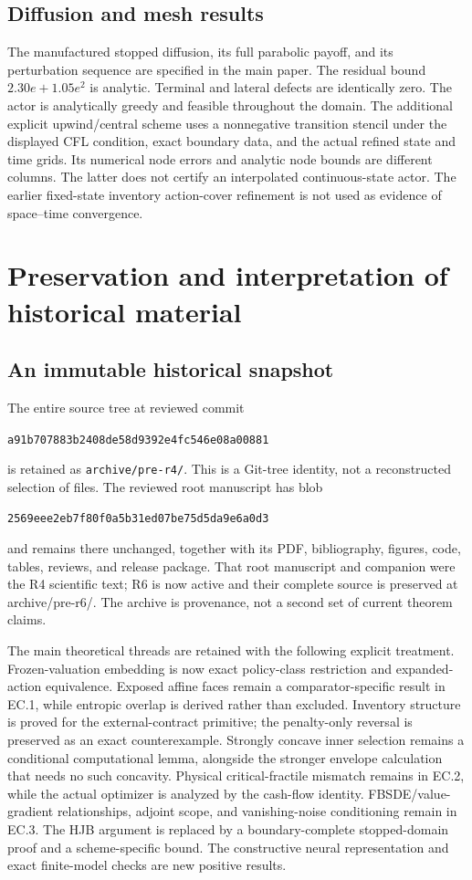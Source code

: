 \subsection{Diffusion and mesh results}
The manufactured stopped diffusion, its full parabolic payoff, and its perturbation sequence are specified in the main paper. The residual bound $2.30e+1.05e^2$ is analytic. Terminal and lateral defects are identically zero. The actor is analytically greedy and feasible throughout the domain. The additional explicit upwind/central scheme uses a nonnegative transition stencil under the displayed CFL condition, exact boundary data, and the actual refined state and time grids. Its numerical node errors and analytic node bounds are different columns. The latter does not certify an interpolated continuous-state actor. The earlier fixed-state inventory action-cover refinement is not used as evidence of space--time convergence.

\section{Preservation and interpretation of historical material}
\subsection{An immutable historical snapshot}
The entire source tree at reviewed commit
\begin{center}\texttt{a91b707883b2408de58d9392e4fc546e08a00881}\end{center}
is retained as \texttt{archive/pre-r4/}. This is a Git-tree identity, not a reconstructed selection of files. The reviewed root manuscript has blob
\begin{center}\texttt{2569eee2eb7f80f0a5b31ed07be75d5da9e6a0d3}\end{center}
and remains there unchanged, together with its PDF, bibliography, figures, code, tables, reviews, and release package. That root manuscript and companion were the R4 scientific text; R6 is now active and their complete source is preserved at archive/pre-r6/. The archive is provenance, not a second set of current theorem claims.

The main theoretical threads are retained with the following explicit treatment. Frozen-valuation embedding is now exact policy-class restriction and expanded-action equivalence. Exposed affine faces remain a comparator-specific result in EC.1, while entropic overlap is derived rather than excluded. Inventory structure is proved for the external-contract primitive; the penalty-only reversal is preserved as an exact counterexample. Strongly concave inner selection remains a conditional computational lemma, alongside the stronger envelope calculation that needs no such concavity. Physical critical-fractile mismatch remains in EC.2, while the actual optimizer is analyzed by the cash-flow identity. FBSDE/value-gradient relationships, adjoint scope, and vanishing-noise conditioning remain in EC.3. The HJB argument is replaced by a boundary-complete stopped-domain proof and a scheme-specific bound. The constructive neural representation and exact finite-model checks are new positive results.

